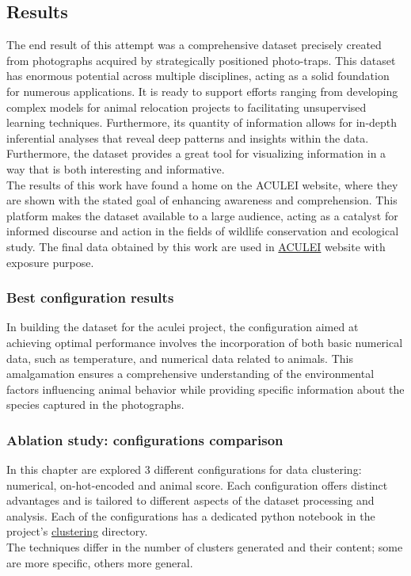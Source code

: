 \documentclass[12pt,a4paper,twoside]{article}
\begin{document}
\subsection{Results}
The end result of this attempt was a comprehensive dataset precisely created from photographs acquired by strategically positioned photo-traps. This dataset has enormous potential across multiple disciplines, acting as a solid foundation for numerous applications. It is ready to support efforts ranging from developing complex models for animal relocation projects to facilitating unsupervised learning techniques. Furthermore, its quantity of information allows for in-depth inferential analyses that reveal deep patterns and insights within the data. Furthermore, the dataset provides a great tool for visualizing information in a way that is both interesting and informative. \\ The results of this work have found a home on the ACULEI website, where they are shown with the stated goal of enhancing awareness and comprehension. This platform makes the dataset available to a large audience, acting as a catalyst for informed discourse and action in the fields of wildlife conservation and ecological study.
The final data obtained by this work are used in \href{https://aculei.xyz}{ACULEI} website with exposure purpose.

\subsubsection{Best configuration results}
In building the dataset for the aculei project, the configuration aimed at achieving optimal performance involves the incorporation of both basic numerical data, such as temperature, and numerical data related to animals. This amalgamation ensures a comprehensive understanding of the environmental factors influencing animal behavior while providing specific information about the species captured in the photographs.


\subsubsection{Ablation study: configurations comparison}
In this chapter are explored 3 different configurations for data clustering: numerical, on-hot-encoded and animal score. Each configuration offers distinct advantages and is tailored to different aspects of the dataset processing and analysis. Each of the configurations has a dedicated python notebook in the project's \href{https://gitlab.com/micheledinelli/aculei-ai/-/tree/main/notebooks/clustering}{clustering} directory.\\
The techniques differ in the number of clusters generated and their content; some are more specific, others more general.
\end{document}

